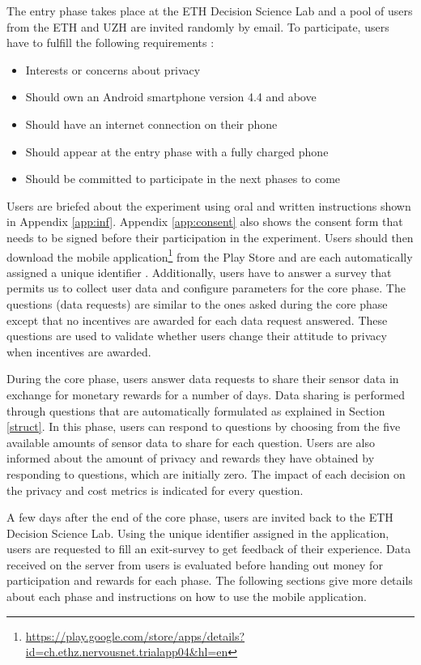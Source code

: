 The entry phase takes place at the ETH Decision Science Lab and a pool of users from the ETH and UZH are invited randomly by email. To participate, users have to fulfill the following requirements \cite{pournarasethical}:

\begin{itemize}
\item Interests or concerns about privacy
\item Should own an Android smartphone version 4.4 and above
\item Should have an internet connection on their phone
\item Should appear at the entry phase with a fully charged phone
\item Should be committed to participate in the next phases to come
\end{itemize}

Users are briefed about the experiment using oral and written instructions shown in Appendix \ref{app:inf}. Appendix \ref{app:consent} also shows the consent form that needs to be signed before their participation in the experiment. Users should then download the mobile application\footnote{\url{https://play.google.com/store/apps/details?id=ch.ethz.nervousnet.trialapp04&hl=en}} from the Play Store and are each automatically assigned a unique identifier . Additionally, users have to answer a survey that permits us to collect user data and configure parameters for the core phase. The questions (data requests) are similar to the ones asked during the core phase except that no incentives are awarded for each data request answered. These questions are used to validate whether users change their attitude to privacy when incentives are awarded.

During the core phase, users answer data requests to share their sensor data in exchange for monetary rewards for a number of days. Data sharing is performed through questions that are automatically formulated as explained in Section \ref{struct}. In this phase, users can respond to questions by choosing from the five available amounts of sensor data to share for each question. Users are also informed about the amount of privacy and rewards they have obtained by responding to questions, which are initially zero. The impact of each decision on the privacy and cost metrics is indicated for every question.

A few days after the end of the core phase, users are invited back to the ETH Decision Science Lab. Using the unique identifier assigned in the application, users are requested to fill an exit-survey to get feedback of their experience. Data received on the server from users is evaluated before handing out money for participation and rewards for each phase. The following sections give more details about each phase and instructions on how to use the mobile application.

